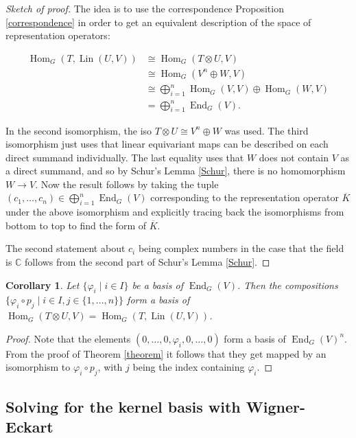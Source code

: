 \documentclass[12pt, a4paper]{article}
\theoremstyle{plain}
\newtheorem{cor}[pro]{Corollary}
\theoremstyle{definition}
\theoremstyle{remark}
\newcommand{\C}{\mathds{C}}
\DeclareMathOperator{\lin}{Lin}
\DeclareMathOperator{\End}{End}
\DeclareMathOperator{\Hom}{Hom}
\begin{document}
\begin{proof}[Sketch of proof]
The idea is to use the correspondence Proposition \ref{correspondence} in order to get an equivalent description of the space of representation operators:

\begin{align*}
\Hom_G(T, \lin(U, V)) & \cong \Hom_G(T \otimes U, V) \\
& \cong \Hom_G(V^n \oplus W, V) \\
& \cong \bigoplus_{i = 1}^{n} \Hom_G(V, V) \oplus \Hom_G(W, V) \\
& = \bigoplus_{i = 1}^{n} \End_G(V).
\end{align*}

In the second isomorphism, the iso $T \otimes U \cong V^n \oplus W$ was used. The third isomorphism just uses that linear equivariant maps can be described on each direct summand individually. The last equality uses that $W$ does not contain $V$ as a direct summand, and so by Schur's Lemma \ref{Schur}, there is no homomorphism $W \to V$. Now the result follows by taking the tuple $(c_1, \dots, c_n) \in \bigoplus_{i = 1}^{n} \End_G(V)$ corresponding to the representation operator $\overline{K}$ under the above isomorphism and explicitly tracing back the isomorphisms from bottom to top to find the form of $\overline{K}$.

The second statement about $c_i$ being complex numbers in the case that the field is $\C$ follows from the second part of Schur's Lemma \ref{Schur}.
\end{proof}

\begin{cor}\label{corollary}
Let $\{ \varphi_i \mid i \in I \}$ be a basis of $\End_G(V)$. Then the compositions $\{ \varphi_i \circ p_j \mid i \in I, j \in \{1, \dots, n\} \}$ form a basis of $\Hom_G(T \otimes U, V) = \Hom_G(T, \lin(U, V))$.
\end{cor}

\begin{proof}
Note that the elements $(0, \dots, 0, \varphi_i, 0, \dots, 0)$ form a basis of $\End_G(V)^n$. From the proof of Theorem \ref{theorem} it follows that they get mapped by an isomorphism to $\varphi_i \circ p_j$, with $j$ being the index containing $\varphi_i$.
\end{proof}


\subsection{Solving for the kernel basis with Wigner-Eckart}
\end{document}
